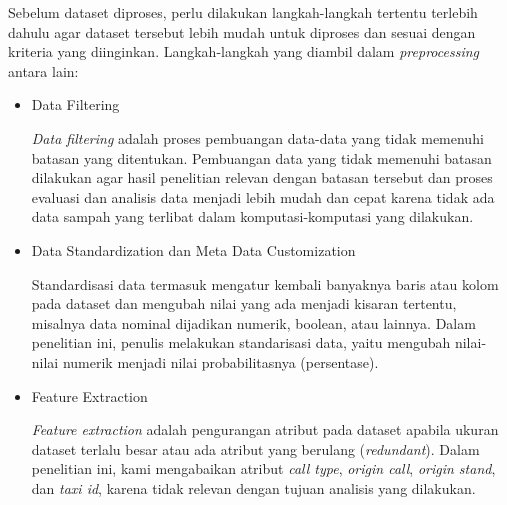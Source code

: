 \documentclass{article}
\begin{document}
\begin{adjustwidth}{4em}{0pt}

\hspace{\parindent}Sebelum dataset diproses, perlu dilakukan langkah-langkah tertentu terlebih dahulu agar dataset tersebut lebih mudah untuk diproses dan sesuai dengan kriteria yang diinginkan. Langkah-langkah yang diambil dalam \textit{preprocessing} antara lain:

\begin{itemize}
	\item{Data Filtering}
		
		\textit{Data filtering} adalah proses pembuangan data-data yang tidak memenuhi batasan yang ditentukan. Pembuangan data yang tidak memenuhi batasan dilakukan agar hasil penelitian relevan dengan batasan tersebut dan proses evaluasi dan analisis data menjadi lebih mudah dan cepat karena tidak ada data sampah yang terlibat dalam komputasi-komputasi yang dilakukan.
		
	\item{Data Standardization dan Meta Data Customization}
		
		Standardisasi data termasuk mengatur kembali banyaknya baris atau kolom pada dataset dan mengubah nilai yang ada menjadi kisaran tertentu, misalnya data nominal dijadikan numerik, boolean, atau lainnya. Dalam penelitian ini, penulis melakukan standarisasi data, yaitu mengubah nilai-nilai numerik menjadi nilai probabilitasnya (persentase).
		
	\item{Feature Extraction}
		
		\textit{Feature extraction} adalah pengurangan atribut pada dataset apabila ukuran dataset terlalu besar atau ada atribut yang berulang (\textit{redundant}). Dalam penelitian ini, kami mengabaikan atribut \textit{call type}, \textit{origin call}, \textit{origin stand}, dan \textit{taxi id}, karena tidak relevan dengan tujuan analisis yang dilakukan.
		
\end{itemize}

\end{adjustwidth}
\end{document}
